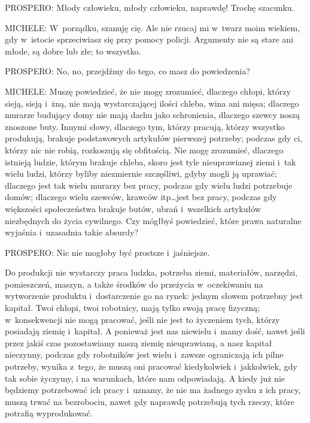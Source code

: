 \documentclass[oneside,polish,11pt,sfheadings]{mwbk}
\begin{document}
 
\noindent PROSPERO: Młody człowieku, młody człowieku, naprawdę! Trochę szacunku. 




 
\noindent MICHELE: W~porządku, szanuję cię. Ale nie rzucaj mi w~twarz moim wiekiem, gdy w~istocie sprzeciwiasz się przy pomocy
policji. Argumenty nie są stare ani młode, są dobre lub złe; to wszystko. 




 
\noindent PROSPERO: No, no, przejdźmy do tego, co masz do powiedzenia? 




 
\noindent MICHELE: Muszę powiedzieć, że nie mogę zrozumieć, dlaczego chłopi, którzy sieją, sieją i~żną, nie mają wystarczającej
ilości chleba, wina ani mięsa; dlaczego murarze budujący domy nie mają dachu jako schronienia, dlaczego szewcy noszą
znoszone buty. Innymi słowy, dlaczego tym, którzy pracują, którzy wszystko produkują, brakuje podstawowych artykułów
pierwszej potrzeby; podczas gdy ci, którzy nic nie robią, rozkoszują się obfitością. Nie mogę zrozumieć, dlaczego
istnieją ludzie, którym brakuje chleba, skoro jest tyle nieuprawianej ziemi i~tak wielu ludzi, którzy byliby
niezmiernie szczęśliwi, gdyby mogli ją uprawiać; dlaczego jest tak wielu murarzy bez pracy, podczas gdy wielu ludzi
potrzebuje domów; dlaczego wielu szewców, krawców itp\ldots jest bez pracy, podczas gdy większości społeczeństwa brakuje
butów, ubrań i~wszelkich artykułów niezbędnych do życia cywilnego. Czy mógłbyś powiedzieć, które prawa naturalne
wyjaśnia i~uzasadnia takie absurdy? 




 
\noindent PROSPERO: Nic nie mogłoby być prostsze i~jaśniejsze. 

 
Do produkcji nie wystarczy praca ludzka, potrzeba ziemi, materiałów, narzędzi, pomieszczeń, maszyn, a także środków do
przeżycia w~oczekiwaniu na wytworzenie produktu i~dostarczenie go na rynek: jednym słowem potrzebny jest kapitał. Twoi
chłopi, twoi robotnicy, mają tylko swoją pracę fizyczną; w~konsekwencji nie mogą pracować, jeśli nie jest to życzeniem
tych, którzy posiadają ziemię i~kapitał. A ponieważ jest nas niewielu i~mamy dość, nawet jeśli przez jakiś czas
pozostawiamy naszą ziemię nieuprawianą, a nasz kapitał nieczynny, podczas gdy robotników jest wielu i~zawsze
ograniczają ich pilne potrzeby, wynika z~tego, że muszą oni pracować kiedykolwiek i~jakkolwiek, gdy tak sobie życzymy,
i na warunkach, które nam odpowiadają. A kiedy już nie będziemy potrzebować ich pracy i~uznamy, że nie ma żadnego zysku
z ich pracy, muszą trwać na bezrobociu, nawet gdy naprawdę potrzebują tych rzeczy, które potrafią wyprodukować. 
\end{document}
